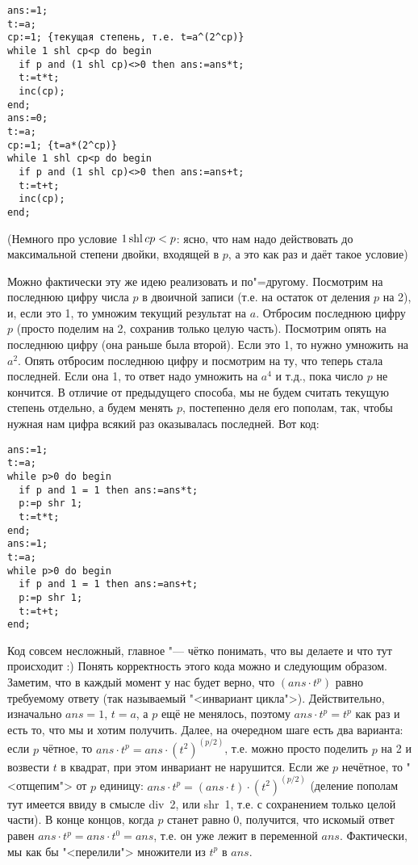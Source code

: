 \begin{codesample}\begin{verbatim}
ans:=1;
t:=a;
cp:=1; {текущая степень, т.е. t=a^(2^cp)}
while 1 shl cp<p do begin
  if p and (1 shl cp)<>0 then ans:=ans*t;
  t:=t*t;
  inc(cp);
end;
ans:=0;
t:=a;
cp:=1; {t=a*(2^cp)}
while 1 shl cp<p do begin
  if p and (1 shl cp)<>0 then ans:=ans+t;
  t:=t+t;
  inc(cp);
end;
\end{verbatim}
\end{codesample}
(Немного про условие $1 \mathop{\mathrm{shl}} cp<p$: ясно, что нам надо действовать до максимальной степени двойки, 
входящей в $p$, а это как раз и даёт такое условие)

Можно фактически эту же идею реализовать и по"=другому. 
Посмотрим на последнюю цифру числа $p$ в двоичной записи (т.е. на остаток от деления $p$ на 2), 
и, если это 1, то умножим текущий результат на $a$. Отбросим последнюю цифру $p$
(просто поделим на 2, сохранив только целую часть). Посмотрим опять на последнюю цифру (она раньше была второй). 
Если это 1, то нужно умножить на $a^2$. 
Опять отбросим последнюю цифру и посмотрим на ту, что теперь стала последней. Если она 1, то 
ответ надо умножить на $a^4$ и т.д., пока число $p$ не кончится. В отличие от предыдущего способа, 
мы не будем считать текущую степень отдельно, а будем менять $p$, постепенно деля его пополам, так, 
чтобы нужная нам цифра всякий раз оказывалась последней.
Вот код:

\begin{codesample}\begin{verbatim}
ans:=1;
t:=a;
while p>0 do begin
  if p and 1 = 1 then ans:=ans*t;
  p:=p shr 1;
  t:=t*t;
end;
ans:=1;
t:=a;
while p>0 do begin
  if p and 1 = 1 then ans:=ans+t;
  p:=p shr 1;
  t:=t+t;
end;
\end{verbatim}
\end{codesample}

Код совсем несложный, главное "--- чётко понимать, что вы делаете и что тут происходит :) 
Понять корректность этого кода можно и следующим образом. Заметим, что в каждый 
момент у нас будет верно, что $(ans\cdot t^p)$ равно требуемому ответу (так называемый 
"<инвариант цикла">). Действительно, изначально $ans=1$, 
$t=a$, а $p$ ещё не менялось, поэтому $ans\cdot t^p=t^p$ как раз и есть то, что мы и хотим 
получить. Далее, на очередном шаге есть два варианта: если $p$ чётное, то 
$ans\cdot t^p=ans\cdot (t^2)^{(p/2)}$, т.е. можно просто поделить $p$ на 2 и возвести $t$ в квадрат, при 
этом инвариант не нарушится. Если же $p$ нечётное, то "<отщепим"> от $p$ единицу: 
$ans\cdot t^p=(ans\cdot t)\cdot (t^2)^{(p/2)}$ (деление пополам тут имеется ввиду в смысле 
div~2, или shr~1, т.е. с сохранением только целой части). В конце концов, когда $p$ станет равно 0, получится, что 
искомый ответ равен $ans\cdot t^p=ans\cdot t^0=ans$, т.е. он уже лежит в переменной $ans$. 
Фактически, мы как бы "<перелили"> множители из $t^p$ в $ans$.

